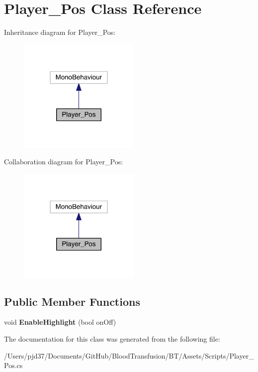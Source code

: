 \hypertarget{class_player___pos}{}\section{Player\+\_\+\+Pos Class Reference}
\label{class_player___pos}


Inheritance diagram for Player\+\_\+\+Pos\+:\nopagebreak
\begin{figure}[H]
\begin{center}
\leavevmode
\includegraphics[width=166pt]{class_player___pos__inherit__graph}
\end{center}
\end{figure}


Collaboration diagram for Player\+\_\+\+Pos\+:\nopagebreak
\begin{figure}[H]
\begin{center}
\leavevmode
\includegraphics[width=166pt]{class_player___pos__coll__graph}
\end{center}
\end{figure}
\subsection*{Public Member Functions}
\begin{DoxyCompactItemize}
\item 
void {\bfseries Enable\+Highlight} (bool on\+Off)\hypertarget{class_player___pos_a9778c4f10a8f3eaebb2857f99165f915}{}\label{class_player___pos_a9778c4f10a8f3eaebb2857f99165f915}

\end{DoxyCompactItemize}


The documentation for this class was generated from the following file\+:\begin{DoxyCompactItemize}
\item 
/\+Users/pjd37/\+Documents/\+Git\+Hub/\+Blood\+Transfusion/\+B\+T/\+Assets/\+Scripts/Player\+\_\+\+Pos.\+cs\end{DoxyCompactItemize}
